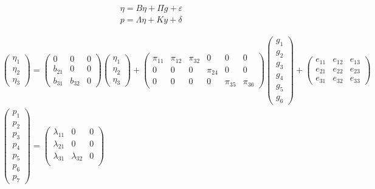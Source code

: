 \documentclass[a4paper,12pt]{article}
\begin{document}
	
\begin{gather*}
	\eta = B \eta + \Pi g + \varepsilon \\
	p = \Lambda \eta + K y + \delta
\end{gather*}

\begin{gather*}
\begin{pmatrix}
	\eta_1 \\
	\eta_2 \\
	\eta_3
\end{pmatrix} =
 \begin{pmatrix}
 	0 & 0 & 0 \\
 	b_{21} & 0 & 0 \\
 	b_{31} & b_{32} & 0
 \end{pmatrix}
\begin{pmatrix}
	\eta_1 \\
	\eta_2 \\
	\eta_3
\end{pmatrix} + 
\begin{pmatrix}
	\pi_{11} & \pi_{12} & \pi_{32} & 0 & 0 & 0 \\
	0 & 0 & 0 & \pi_{24} & 0 & 0 \\
	0 & 0 & 0 & 0 & \pi_{35} & \pi_{36}
\end{pmatrix}
\begin{pmatrix}
	g_1 \\ g_2 \\ g_3 \\ g_4 \\ g_5 \\ g_6
\end{pmatrix} +
\begin{pmatrix}
	e_{11} & e_{12} & e_{13} \\
	e_{21} & e_{22} & e_{23} \\
	e_{31} & e_{32} & e_{33}
\end{pmatrix} \\
\begin{pmatrix}
	p_1 \\ p_2 \\ p_3 \\ p_4 \\ p_5 \\ p_6 \\ p_7
\end{pmatrix} =
\begin{pmatrix}
	\lambda_{11} & 0 & 0 \\
	\lambda_{21} & 0 & 0 \\
	\lambda_{31} & \lambda_{32} & 0 \\

\end{pmatrix}
\end{gather*}
\end{document}
